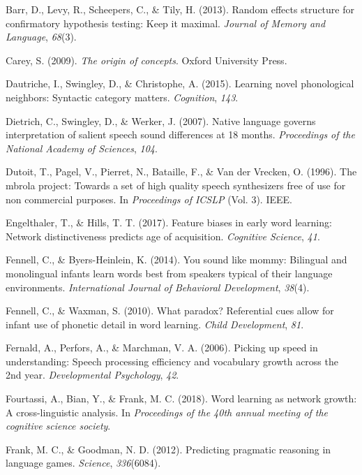 \documentclass[english,,man,floatsintext]{apa6}
\theoremstyle{definition}
\theoremstyle{definition}
\theoremstyle{definition}
\theoremstyle{remark}
\begin{document}
\hypertarget{ref-barr2013}{}
Barr, D., Levy, R., Scheepers, C., \& Tily, H. (2013). Random effects
structure for confirmatory hypothesis testing: Keep it maximal.
\emph{Journal of Memory and Language}, \emph{68}(3).

\hypertarget{ref-carey2009}{}
Carey, S. (2009). \emph{The origin of concepts}. Oxford University
Press.

\hypertarget{ref-dautriche2015}{}
Dautriche, I., Swingley, D., \& Christophe, A. (2015). Learning novel
phonological neighbors: Syntactic category matters. \emph{Cognition},
\emph{143}.

\hypertarget{ref-dietrich2007}{}
Dietrich, C., Swingley, D., \& Werker, J. (2007). Native language
governs interpretation of salient speech sound differences at 18 months.
\emph{Proceedings of the National Academy of Sciences}, \emph{104}.

\hypertarget{ref-dutoit1996}{}
Dutoit, T., Pagel, V., Pierret, N., Bataille, F., \& Van der Vrecken, O.
(1996). The mbrola project: Towards a set of high quality speech
synthesizers free of use for non commercial purposes. In
\emph{Proceedings of ICSLP} (Vol. 3). IEEE.

\hypertarget{ref-engelthaler2017}{}
Engelthaler, T., \& Hills, T. T. (2017). Feature biases in early word
learning: Network distinctiveness predicts age of acquisition.
\emph{Cognitive Science}, \emph{41}.

\hypertarget{ref-Fennell2014}{}
Fennell, C., \& Byers-Heinlein, K. (2014). You sound like mommy:
Bilingual and monolingual infants learn words best from speakers typical
of their language environments. \emph{International Journal of
Behavioral Development}, \emph{38}(4).

\hypertarget{ref-fennell2010}{}
Fennell, C., \& Waxman, S. (2010). What paradox? Referential cues allow
for infant use of phonetic detail in word learning. \emph{Child
Development}, \emph{81}.

\hypertarget{ref-fernald2006}{}
Fernald, A., Perfors, A., \& Marchman, V. A. (2006). Picking up speed in
understanding: Speech processing efficiency and vocabulary growth across
the 2nd year. \emph{Developmental Psychology}, \emph{42}.

\hypertarget{ref-fourtassi2018}{}
Fourtassi, A., Bian, Y., \& Frank, M. C. (2018). Word learning as
network growth: A cross-linguistic analysis. In \emph{Proceedings of the
40th annual meeting of the cognitive science society}.

\hypertarget{ref-frank2012}{}
Frank, M. C., \& Goodman, N. D. (2012). Predicting pragmatic reasoning
in language games. \emph{Science}, \emph{336}(6084).
\end{document}
